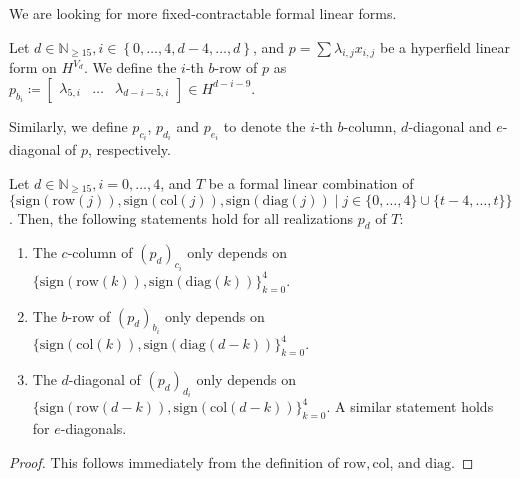 We are looking for more fixed-contractable formal linear forms.

\begin{definition}
    Let \( d \in \mathbb{N}_{\geq 15} , i \in \left\{ 0,\dots,4,d-4, \dots, d \right\}\), and $p = \sum \lambda_{i,j} x_{i,j}$ be a hyperfield linear form on \( H^{V_d} \). We define the $i$-th $b$-row of $p$ as \( p_{b_{i}} \coloneqq \begin{bmatrix} \lambda_{5,i} & \dots & \lambda_{d-i-5,i} \end{bmatrix} \in H^{d -  i - 9} \).
  
   Similarly, we define $p_{c_{i}}$, $p_{d_{i}}$ and $p_{e_{i}}$ to denote the $i$-th $b$-column, $d$-diagonal and $e$-diagonal of $p$, respectively.
  \end{definition}


\begin{proposition}
    Let \( d \in \mathbb{N}_{\geq 15} , i  = 0, \dots, 4\), and $T$ be a formal linear combination of \(  \{ \mathrm{sign}(\mathrm{row}(j)), \mathrm{sign}(\mathrm{col}(j)), \mathrm{sign}(\mathrm{diag}(j)) \mid j \in \{ 0, \dots, 4\} \cup \{ t-4, \dots, t \} \} \).
Then, the following statements hold for all realizations \( p_d \) of \( T \):
  \begin{enumerate}
  \item The $c$-column of $(p_d)_{c_i}$ only depends on $\{ \mathrm{sign}(\mathrm{row}(k)), \mathrm{sign}(\mathrm{diag}(k)) \}_{k = 0}^4$.
  \item The $b$-row of $(p_d)_{b_i}$ only depends on $\{ \mathrm{sign}(\mathrm{col}(k)), \mathrm{sign}(\mathrm{diag}(d-k)) \}_{k = 0}^4$.
  \item The $d$-diagonal of $(p_d)_{d_i}$ only depends on \(\{ \mathrm{sign}(\mathrm{row}(d-k)), \mathrm{sign}(\mathrm{col}(d-k)) \}_{k = 0}^4 \). A similar statement holds for $e$-diagonals.
  \end{enumerate}
  \end{proposition}
  
  \begin{proof}
   This follows immediately from the definition of $\mathrm{row}, \mathrm{col}$, and $\mathrm{diag}$.
  \end{proof}

